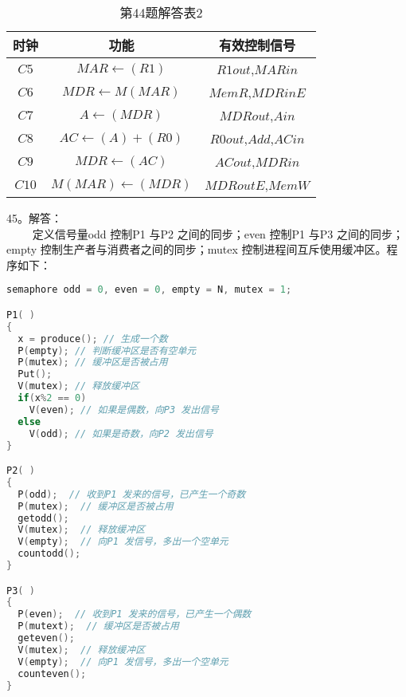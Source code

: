\begin{table}[ht]
\centering
\caption{第44题解答表2}\label{CSN09_tab7}
\begin{tabular}{|c|c|c|}
\hline
时钟 & 功能 & 有效控制信号 \\
\hline
$C5$ & $MAR\leftarrow(R1)$ & $R1out$,$MARin$ \\
\hline
$C6$ & $MDR\leftarrow M(MAR)$ & $MemR$,$MDRinE$ \\
\hline
$C7$ & $A\leftarrow(MDR)$ & $MDRout$,$Ain$ \\
\hline
$C8$ & $AC\leftarrow(A)+(R0)$ & $R0out$,$Add$,$ACin$ \\
\hline
$C9$ & $MDR\leftarrow(AC)$ & $ACout$,$MDRin$ \\
\hline
$C10$ & $M(MAR)\leftarrow(MDR)$ & $MDRoutE$,$MemW$ \\
\hline
\end{tabular}
\end{table}

45。解答： \\
$\qquad$ 定义信号量odd 控制P1 与P2 之间的同步；even 控制P1 与P3 之间的同步；empty 控制生产者与消费者之间的同步；mutex 控制进程间互斥使用缓冲区。程序如下：
\begin{lstlisting}[language=cpp]
semaphore odd = 0, even = 0, empty = N, mutex = 1;

P1( )
{
  x = produce(); // 生成一个数
  P(empty); // 判断缓冲区是否有空单元
  P(mutex); // 缓冲区是否被占用
  Put();
  V(mutex); // 释放缓冲区
  if(x%2 == 0)
    V(even); // 如果是偶数，向P3 发出信号
  else
    V(odd); // 如果是奇数，向P2 发出信号
}

P2( )
{
  P(odd);  // 收到P1 发来的信号，已产生一个奇数
  P(mutex);  // 缓冲区是否被占用
  getodd();
  V(mutex);  // 释放缓冲区
  V(empty);  // 向P1 发信号，多出一个空单元
  countodd();
}

P3( )
{
  P(even);  // 收到P1 发来的信号，已产生一个偶数
  P(mutext);  // 缓冲区是否被占用
  geteven();
  V(mutex);  // 释放缓冲区
  V(empty);  // 向P1 发信号，多出一个空单元
  counteven();
}
\end{lstlisting}

